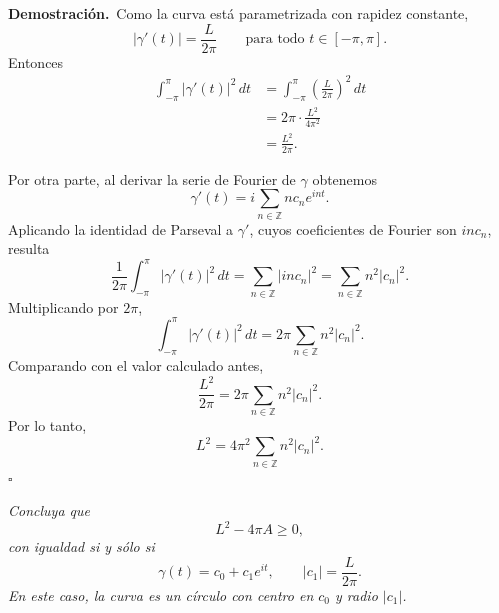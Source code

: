\documentclass[11pt,letterpaper]{article}
\newcommand{\Z}{\mathbb{Z}}
\newcommand{\dt}{\,dt}
\begin{document}
\textbf{Demostración.}\,
Como la curva está parametrizada con rapidez constante,
\begin{equation*}
    |\gamma'(t)|=\frac{L}{2\pi}
    \qquad\text{para todo } t\in[-\pi,\pi].
\end{equation*}
Entonces
\begin{align*}
    \int_{-\pi}^{\pi}|\gamma'(t)|^2\dt
    &=\int_{-\pi}^{\pi}\left(\frac{L}{2\pi}\right)^2\dt \\
    &=2\pi\cdot\frac{L^2}{4\pi^2} \\
    &=\frac{L^2}{2\pi}.
\end{align*}

Por otra parte, al derivar la serie de Fourier de $\gamma$ obtenemos
\begin{equation*}
    \gamma'(t)=i\sum_{n\in\Z}n c_n e^{int}.
\end{equation*}
Aplicando la identidad de Parseval a $\gamma'$, cuyos coeficientes de Fourier son $inc_n$, resulta
\begin{equation*}
    \frac{1}{2\pi}\int_{-\pi}^{\pi}|\gamma'(t)|^2\dt
    =\sum_{n\in\Z}|inc_n|^2
    =\sum_{n\in\Z}n^2|c_n|^2.
\end{equation*}
Multiplicando por $2\pi$,
\begin{equation*}
    \int_{-\pi}^{\pi}|\gamma'(t)|^2\dt
    =2\pi\sum_{n\in\Z}n^2|c_n|^2.
\end{equation*}
Comparando con el valor calculado antes,
\begin{equation*}
    \frac{L^2}{2\pi}=2\pi\sum_{n\in\Z}n^2|c_n|^2.
\end{equation*}
Por lo tanto,\begin{equation*}
    L^2=4\pi^2\sum_{n\in\Z}n^2|c_n|^2.
\end{equation*}
\hfill $\square$

\newpage

\begin{tcolorbox}[title=\textcolor{white}{Problema 16}]
\textit{Concluya que}
\begin{equation*}
    L^2-4\pi A\geq 0,
\end{equation*}
\textit{con igualdad si y sólo si}
\begin{equation*}
    \gamma(t)=c_0+c_1e^{it},
    \qquad |c_1|=\frac{L}{2\pi}.
\end{equation*}
\textit{En este caso, la curva es un círculo con centro en $c_0$ y radio $|c_1|$.}
\end{tcolorbox}
\end{document}
